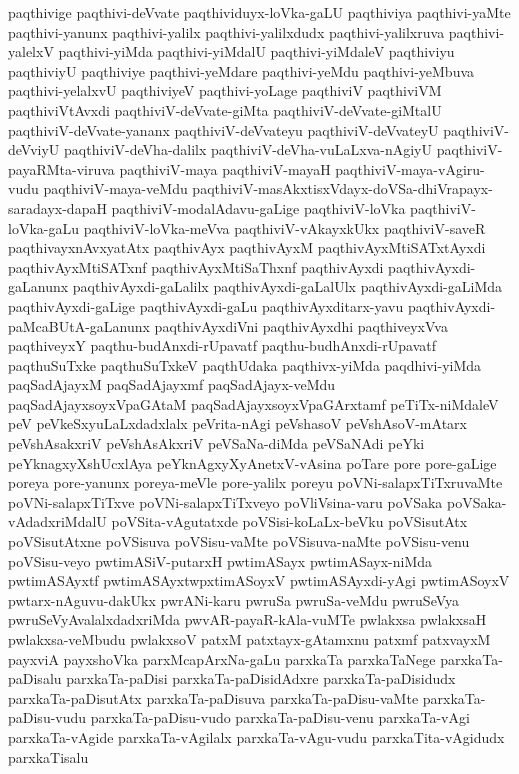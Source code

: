 {paqthivige
paqthivi-deVvate
paqthividuyx-loVka-gaLU
paqthiviya
paqthivi-yaMte
paqthivi-yanunx
paqthivi-yalilx
paqthivi-yalilxdudx
paqthivi-yalilxruva
paqthivi-yalelxV
paqthivi-yiMda
paqthivi-yiMdalU
paqthivi-yiMdaleV
paqthiviyu
paqthiviyU
paqthiviye
paqthivi-yeMdare
paqthivi-yeMdu
paqthivi-yeMbuva
paqthivi-yelalxvU
paqthiviyeV
paqthivi-yoLage
paqthiviV
paqthiviVM
paqthiviVtAvxdi
paqthiviV-deVvate-giMta
paqthiviV-deVvate-giMtalU
paqthiviV-deVvate-yananx
paqthiviV-deVvateyu
paqthiviV-deVvateyU
paqthiviV-deVviyU
paqthiviV-deVha-dalilx
paqthiviV-deVha-vuLaLxva-nAgiyU
paqthiviV-payaRMta-viruva
paqthiviV-maya
paqthiviV-mayaH
paqthiviV-maya-vAgiru-vudu
paqthiviV-maya-veMdu
paqthiviV-masAkxtisxVdayx-doVSa-dhiVrapayx-saradayx-dapaH
paqthiviV-modalAdavu-gaLige
paqthiviV-loVka
paqthiviV-loVka-gaLu
paqthiviV-loVka-meVva
paqthiviV-vAkayxkUkx
paqthiviV-saveR
paqthivayxnAvxyatAtx
paqthivAyx
paqthivAyxM
paqthivAyxMtiSATxtAyxdi
paqthivAyxMtiSATxnf
paqthivAyxMtiSaThxnf
paqthivAyxdi
paqthivAyxdi-gaLanunx
paqthivAyxdi-gaLalilx
paqthivAyxdi-gaLalUlx
paqthivAyxdi-gaLiMda
paqthivAyxdi-gaLige
paqthivAyxdi-gaLu
paqthivAyxditarx-yavu
paqthivAyxdi-paMcaBUtA-gaLanunx
paqthivAyxdiVni
paqthivAyxdhi
paqthiveyxVva
paqthiveyxY
paqthu-budAnxdi-rUpavatf
paqthu-budhAnxdi-rUpavatf
paqthuSuTxke
paqthuSuTxkeV
paqthUdaka
paqthivx-yiMda
paqdhivi-yiMda
paqSadAjayxM
paqSadAjayxmf
paqSadAjayx-veMdu
paqSadAjayxsoyxVpaGAtaM
paqSadAjayxsoyxVpaGArxtamf
peTiTx-niMdaleV
peV
peVkeSxyuLaLxdadxlalx
peVrita-nAgi
peVshasoV
peVshAsoV-mAtarx
peVshAsakxriV
peVshAsAkxriV
peVSaNa-diMda
peVSaNAdi
peYki
peYknagxyXshUcxlAya
peYknAgxyXyAnetxV-vAsina
poTare
pore
pore-gaLige
poreya
pore-yanunx
poreya-meVle
pore-yalilx
poreyu
poVNi-salapxTiTxruvaMte
poVNi-salapxTiTxve
poVNi-salapxTiTxveyo
poVliVsina-varu
poVSaka
poVSaka-vAdadxriMdalU
poVSita-vAgutatxde
poVSisi-koLaLx-beVku
poVSisutAtx
poVSisutAtxne
poVSisuva
poVSisu-vaMte
poVSisuva-naMte
poVSisu-venu
poVSisu-veyo
pwtimASiV-putarxH
pwtimASayx
pwtimASayx-niMda
pwtimASAyxtf
pwtimASAyxtwpxtimASoyxV
pwtimASAyxdi-yAgi
pwtimASoyxV
pwtarx-nAguvu-dakUkx
pwrANi-karu
pwruSa
pwruSa-veMdu
pwruSeVya
pwruSeVyAvalalxdadxriMda
pwvAR-payaR-kAla-vuMTe
pwlakxsa
pwlakxsaH
pwlakxsa-veMbudu
pwlakxsoV
patxM
patxtayx-gAtamxnu
patxmf
patxvayxM
payxviA
payxshoVka
parxMcapArxNa-gaLu
parxkaTa
parxkaTaNege
parxkaTa-paDisalu
parxkaTa-paDisi
parxkaTa-paDisidAdxre
parxkaTa-paDisidudx
parxkaTa-paDisutAtx
parxkaTa-paDisuva
parxkaTa-paDisu-vaMte
parxkaTa-paDisu-vudu
parxkaTa-paDisu-vudo
parxkaTa-paDisu-venu
parxkaTa-vAgi
parxkaTa-vAgide
parxkaTa-vAgilalx
parxkaTa-vAgu-vudu
parxkaTita-vAgidudx
parxkaTisalu
}
